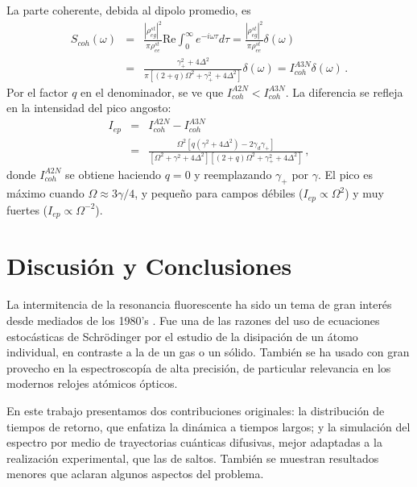 \documentclass[superscriptaddress,12pt,amsmath]{revtex4-2}
\begin{document}
La parte coherente, debida al dipolo promedio, es 
%
\begin{eqnarray} 	\label{eq:ScohDef}
S_{coh}(\omega) &=& \frac{|\rho_{eg}^{st}|^2}{\pi \rho_{ee}^{st}} \mathrm{Re} 
	\int_0^{\infty}  e^{-i \omega \tau} d\tau 	
	= \frac{|\rho_{eg}^{st}|^2}{\pi \rho_{ee}^{st}}  \delta(\omega) \nonumber \\
&=& \frac{\gamma_+^2 +4 \Delta^2}
	{\pi \left[ (2+q)\Omega^2 +\gamma_+^2 +4 \Delta^2 \right] } \delta(\omega) 
	= I_{coh}^{A3N} \delta(\omega) \,. 	 
\end{eqnarray}
Por el factor $q$ en el denominador, se ve que 
$I_{coh}^{A2N} < I_{coh}^{A3N}$. La diferencia se refleja en la intensidad 
del pico angosto:
%
\begin{eqnarray} 	
I_{ep} &=&  I_{coh}^{A2N} - I_{coh}^{A3N} 	\\
&=& \frac{ \Omega^2 \left[ q (\gamma^2 +4 \Delta^2) -2\gamma_d \gamma_+ \right] }
{ \left[ \Omega^2 +\gamma^2 +4 \Delta^2 \right] 
\left[ (2+q)\Omega^2 +\gamma_+^2 +4 \Delta^2 \right] }	\,,  \nonumber
\end{eqnarray}
donde $I_{coh}^{A2N}$ se obtiene haciendo $q=0$ y reemplazando 
$\gamma_+$ por $\gamma$. El pico es m\'aximo cuando  
$\Omega \approx 3\gamma/4$, y peque\~no para campos d\'ebiles 
($I_{ep} \propto \Omega^2$) y muy fuertes ($I_{ep} \propto \Omega^{-2}$). 


\section{Discusi\'on y Conclusiones}
La intermitencia de la resonancia fluorescente ha sido un tema de gran 
inter\'es desde mediados de los 1980's \cite{PlKn98}. Fue una de las 
razones del uso de ecuaciones estoc\'asticas de Schr\"odinger por el 
estudio de la disipaci\'on de un \'atomo individual, en contraste a la de 
un gas o un s\'olido. Tambi\'en se ha usado con gran provecho en la 
espectroscop\'ia de alta precisi\'on, de particular relevancia en los 
modernos relojes at\'omicos \'opticos.   

En este trabajo presentamos dos contribuciones originales: la distribuci\'on 
de tiempos de retorno, que enfatiza la din\'amica a tiempos largos; y la 
simulaci\'on del espectro por medio de trayectorias cu\'anticas difusivas, 
mejor adaptadas a la realizaci\'on experimental, que las de saltos. 
Tambi\'en se muestran resultados menores que aclaran algunos aspectos 
del problema.    
\end{document}
